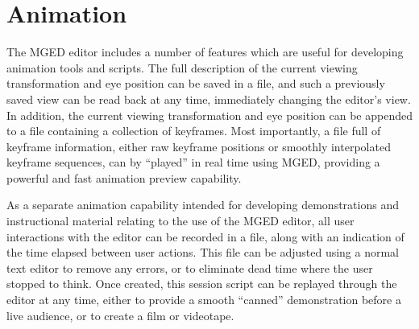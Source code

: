 \section{Animation}

The MGED editor includes a number of features which are useful
for developing animation tools and scripts.
The full description of the current viewing transformation and eye position
can be saved in a file,
and such a previously saved view can be read back at any time,
immediately changing the editor's view.
In addition, the current viewing transformation and eye position can be
appended to a file containing a collection of keyframes.
Most importantly, a file full of keyframe information, either raw keyframe
positions or smoothly interpolated keyframe sequences, can
by ``played'' in real time using MGED,
providing a powerful and fast animation preview capability.

As a separate animation capability intended
for developing demonstrations and instructional material relating to the
use of the MGED editor,
all user interactions with the editor can be recorded in a file,
along with an indication of the time elapsed between user actions.
This file can be  adjusted using a normal text editor to remove any errors,
or to eliminate dead time where the user stopped to think.
Once created, this session script can be replayed through the editor
at any time, either to provide a smooth ``canned'' demonstration
before a live audience, or to create a film or videotape.
